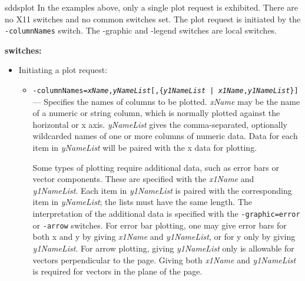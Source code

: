\begin{sddsprog}{sddsplot}
In the examples above, only a single plot request is exhibited.  There are no X11 switches and no common switches
set.  The plot request is initiated by the {\tt -columnNames} switch.  The {-graphic} and {-legend} switches are
local switches.

  \item \textbf{switches:}
\begin{itemize}
\item Initiating a plot request:\\
  \begin{itemize}
  \item {\tt -columnNames={\em xName},{\em yNameList}[,\{{\em y1NameList} | {\em x1Name},{\em y1NameList}\}] }---
        Specifies the names of columns to be plotted.  {\em xName} may be the name of a numeric or string column,
        which is normally plotted against the horizontal or x axis.
        {\em yNameList} gives the comma-separated, optionally wildcarded names of one or more columns of numeric
        data.  Data for each item in {\em yNameList} will be paired with the x data for plotting.

        Some types of plotting require additional data, such as error bars or vector components.  These are
        specified with the {\em x1Name} and {\em y1NameList}.  Each item in {\em y1NameList} is paired with the
        corresponding item in {\em yNameList}; the lists must have the same length.  The interpretation of the
        additional data is specified with the {\tt -graphic=error} or {\tt -arrow} switches. For error bar
        plotting, one may give error bars for both x and y by giving {\em x1Name} and {\em y1NameList}, or for y
        only by giving {\em y1NameList}.  For arrow plotting, giving {\em y1NameList} only is allowable for
        vectors perpendicular to the page. Giving both {\em x1Name} and {\em y1NameList} is required for vectors
        in the plane of the page.


\end{itemize}
\end{itemize}
\end{sddsprog}
